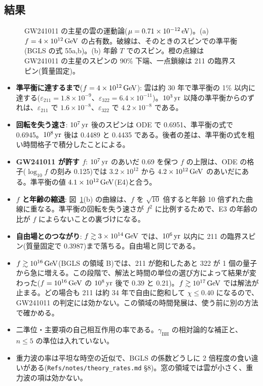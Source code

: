 \subsection{結果}

\begin{figure}[H]
\centering

\caption{GW241011 の主星の雲の運動論($\mu=0.71\times10^{-12}\,\mathrm{eV}$)。(a) $f=4\times10^{12}\,\mathrm{GeV}$ の占有数。破線は、そのときのスピンでの準平衡(BGLS の式 55a,b)。(b) 年齢 $T$ でのスピン。橙の点線は GW241011 の主星のスピンの 90\% 下端、一点鎖線は 211 の臨界スピン(質量固定)。}
\label{fig:e05}
\end{figure}

\begin{result}
\begin{itemize}
\item \textbf{準平衡に達するまで}($f=4\times10^{12}\,\mathrm{GeV}$): 雲は約 30 年で準平衡の 1\% 以内に達する($\varepsilon_{211}=1.8\times10^{-9}$、$\varepsilon_{322}=6.4\times10^{-11}$)。$10^3\,\mathrm{yr}$ 以降の準平衡からのずれは、$\varepsilon_{211}$ で $1.6\times10^{-8}$、$\varepsilon_{322}$ で $4.2\times10^{-8}$ である。
\item \textbf{回転を失う速さ}: $10^7\,\mathrm{yr}$ 後のスピンは ODE で 0.6951、準平衡の式で 0.6945。$10^8\,\mathrm{yr}$ 後は 0.4489 と 0.4435 である。後者の差は、準平衡の式を粗い時間格子で積分したことによる。
\item \textbf{GW241011 が許す $f$}: $10^7\,\mathrm{yr}$ のあいだ 0.69 を保つ $f$ の上限は、ODE の格子($\log_{10}f$ の刻み 0.125)では $3.2\times10^{12}$ から $4.2\times10^{12}\,\mathrm{GeV}$ のあいだにある。準平衡の値 $4.1\times10^{12}\,\mathrm{GeV}$(E4)と合う。
\item \textbf{$f$ と年齢の縮退}: 図~\ref{fig:e05}(b) の曲線は、$f$ を $\sqrt{10}$ 倍すると年齢 10 倍ずれた曲線に重なる。準平衡の回転を失う速さが $f^2$ に比例するためで、E3 の年齢の比が $f$ によらないことの裏づけになる。
\item \textbf{自由場とのつながり}: $f\gtrsim3\times10^{14}\,\mathrm{GeV}$ では、$10^6\,\mathrm{yr}$ 以内に 211 の臨界スピン(質量固定で 0.3987)まで落ちる。自由場と同じである。
\end{itemize}
\end{result}

\begin{caveat}
\begin{itemize}
\item $f\gtrsim10^{16}\,\mathrm{GeV}$(BGLS の領域 B)では、211 が飽和したあと 322 が 1 個の量子から急に増える。この段階で、解法と時間の単位の選び方によって結果が変わった($f=10^{16}\,\mathrm{GeV}$ の $10^8\,\mathrm{yr}$ 後で 0.39 と 0.21)。$f\gtrsim10^{17}\,\mathrm{GeV}$ では解法が止まる。どの場合も 211 は約 34 年で自由に飽和して $\chi\le0.40$ になるので、GW241011 の判定には効かない。この領域の時間発展は、使う前に別の方法で確かめる。
\item 二準位・主要項の自己相互作用の率である。$\gamma_\mathrm{BH}$ の相対論的な補正と、$n\le5$ の準位は入れていない。
\item 重力波の率は平坦な時空の近似で、BGLS の係数どうしに 2 倍程度の食い違いがある(\texttt{Refs/notes/theory\_rates.md} \S8)。窓の領域では雲が小さく、重力波の項は効かない。
\end{itemize}
\end{caveat}
